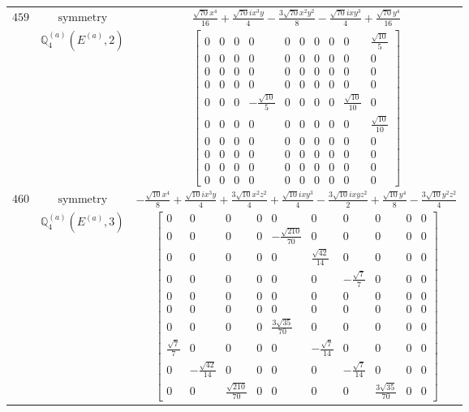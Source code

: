 \documentclass[fleqn,8pt,landscape]{jsarticle}
\begin{document}
\begin{longtable}{ccc}
$ 459 $ & $ \text{symmetry} $ & $ \frac{\sqrt{70} x^{4}}{16} + \frac{\sqrt{70} i x^{3} y}{4} - \frac{3 \sqrt{70} x^{2} y^{2}}{8} - \frac{\sqrt{70} i x y^{3}}{4} + \frac{\sqrt{70} y^{4}}{16} $ \\
$  $ & $ \mathbb{Q}_{4}^{(a)}(E^{(a)},2) $ & $ \begin{bmatrix} 0 & 0 & 0 & 0 & 0 & 0 & 0 & 0 & 0 & \frac{\sqrt{10}}{5} \\ 0 & 0 & 0 & 0 & 0 & 0 & 0 & 0 & 0 & 0 \\ 0 & 0 & 0 & 0 & 0 & 0 & 0 & 0 & 0 & 0 \\ 0 & 0 & 0 & 0 & 0 & 0 & 0 & 0 & 0 & 0 \\ 0 & 0 & 0 & - \frac{\sqrt{10}}{5} & 0 & 0 & 0 & 0 & \frac{\sqrt{10}}{10} & 0 \\ 0 & 0 & 0 & 0 & 0 & 0 & 0 & 0 & 0 & \frac{\sqrt{10}}{10} \\ 0 & 0 & 0 & 0 & 0 & 0 & 0 & 0 & 0 & 0 \\ 0 & 0 & 0 & 0 & 0 & 0 & 0 & 0 & 0 & 0 \\ 0 & 0 & 0 & 0 & 0 & 0 & 0 & 0 & 0 & 0 \\ 0 & 0 & 0 & 0 & 0 & 0 & 0 & 0 & 0 & 0 \end{bmatrix} $ \\ \hline
$ 460 $ & $ \text{symmetry} $ & $ - \frac{\sqrt{10} x^{4}}{8} + \frac{\sqrt{10} i x^{3} y}{4} + \frac{3 \sqrt{10} x^{2} z^{2}}{4} + \frac{\sqrt{10} i x y^{3}}{4} - \frac{3 \sqrt{10} i x y z^{2}}{2} + \frac{\sqrt{10} y^{4}}{8} - \frac{3 \sqrt{10} y^{2} z^{2}}{4} $ \\
$  $ & $ \mathbb{Q}_{4}^{(a)}(E^{(a)},3) $ & $ \begin{bmatrix} 0 & 0 & 0 & 0 & 0 & 0 & 0 & 0 & 0 & 0 \\ 0 & 0 & 0 & 0 & - \frac{\sqrt{210}}{70} & 0 & 0 & 0 & 0 & 0 \\ 0 & 0 & 0 & 0 & 0 & \frac{\sqrt{42}}{14} & 0 & 0 & 0 & 0 \\ 0 & 0 & 0 & 0 & 0 & 0 & - \frac{\sqrt{7}}{7} & 0 & 0 & 0 \\ 0 & 0 & 0 & 0 & 0 & 0 & 0 & 0 & 0 & 0 \\ 0 & 0 & 0 & 0 & 0 & 0 & 0 & 0 & 0 & 0 \\ 0 & 0 & 0 & 0 & \frac{3 \sqrt{35}}{70} & 0 & 0 & 0 & 0 & 0 \\ \frac{\sqrt{7}}{7} & 0 & 0 & 0 & 0 & - \frac{\sqrt{7}}{14} & 0 & 0 & 0 & 0 \\ 0 & - \frac{\sqrt{42}}{14} & 0 & 0 & 0 & 0 & - \frac{\sqrt{7}}{14} & 0 & 0 & 0 \\ 0 & 0 & \frac{\sqrt{210}}{70} & 0 & 0 & 0 & 0 & \frac{3 \sqrt{35}}{70} & 0 & 0 \end{bmatrix} $ \\ \hline

\end{longtable}
\end{document}
